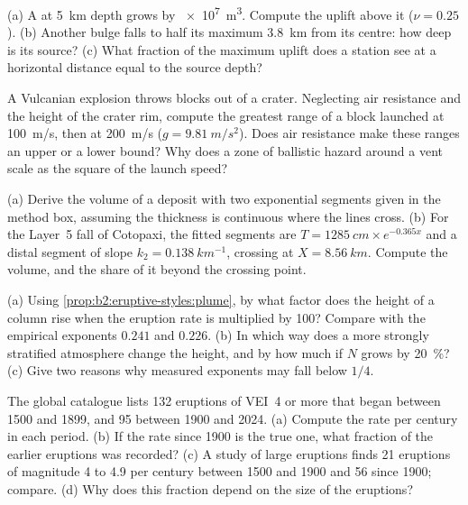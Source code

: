 \begin{exercise}[$\star\star$]\label{exo:b2:eruptive-styles:8}
(a) A  at \qty{5}{km} depth grows by \qty{e7}{m^3}. Compute the
uplift above it ($\nu = 0.25$). (b) Another bulge falls to half its maximum
\qty{3.8}{km} from its centre: how deep is its source? (c) What fraction of the
maximum uplift does a station see at a horizontal distance equal to the source
depth?
\end{exercise}

\begin{exercise}[$\star\star$]\label{exo:b2:eruptive-styles:9}
A Vulcanian explosion throws blocks out of a crater. Neglecting air resistance
and the height of the crater rim, compute the greatest range of a block launched
at \qty{100}{m/s}, then at \qty{200}{m/s} ($g = \qty{9.81}{m/s^2}$). Does air
resistance make these ranges an upper or a lower bound? Why does a zone of
ballistic hazard around a vent scale as the square of the launch speed?
\end{exercise}

\begin{exercise}[$\star\star\star$]\label{exo:b2:eruptive-styles:10}
(a) Derive the volume of a deposit with two exponential segments given in the
method box, assuming the thickness is continuous where the lines cross. (b) For
the Layer~5 fall of Cotopaxi, the fitted segments are $T = \qty{1285}{cm}\times
e^{-0.365x}$ and a distal segment of slope $k_2 = \qty{0.138}{km^{-1}}$, crossing at
$X = \qty{8.56}{km}$. Compute the volume, and the share of it beyond the crossing
point.
\end{exercise}

\begin{exercise}[$\star\star\star$]\label{exo:b2:eruptive-styles:11}
(a) Using \cref{prop:b2:eruptive-styles:plume}, by what factor does the height of a
column rise when the eruption rate is multiplied by 100? Compare with the
empirical exponents $0.241$ and $0.226$. (b) In which way does a more strongly
stratified atmosphere change the height, and by how much if $N$ grows by
\qty{20}{\percent}? (c) Give two reasons why measured exponents may fall below
$1/4$.
\end{exercise}

\begin{exercise}[$\star\star\star$]\label{exo:b2:eruptive-styles:12}
The global catalogue lists 132 eruptions of VEI~4 or more that began between 1500
and 1899, and 95 between 1900 and 2024. (a) Compute the rate per century in each
period. (b) If the rate since 1900 is the true one, what fraction of the earlier
eruptions was recorded? (c) A study of large eruptions finds 21 eruptions of
magnitude 4 to 4.9 per century between 1500 and 1900 and 56 since 1900; compare.
(d) Why does this fraction depend on the size of the eruptions?
\end{exercise}


